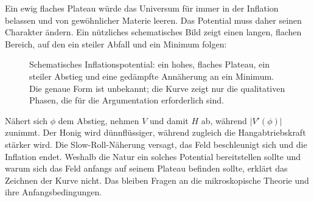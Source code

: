 Ein ewig flaches Plateau würde das Universum für immer in der Inflation belassen und von gewöhnlicher Materie leeren. Das Potential muss daher seinen Charakter ändern. Ein nützliches schematisches Bild zeigt einen langen, flachen Bereich, auf den ein steiler Abfall und ein Minimum folgen:
\begin{figure}[htbp]
\centering
\begin{coursefitfigure}
\end{coursefitfigure}
\caption{Schematisches Inflationspotential: ein hohes, flaches Plateau, ein steiler Abstieg und eine gedämpfte Annäherung an ein Minimum. Die genaue Form ist unbekannt; die Kurve zeigt nur die qualitativen Phasen, die für die Argumentation erforderlich sind.}
\label{fig:c09-inflation-potential}
\end{figure}

Nähert sich \(\phi\) dem Abstieg, nehmen \(V\) und damit \(H\) ab, während \(\lvert V'(\phi)\rvert\) zunimmt. Der Honig wird dünnflüssiger, während zugleich die Hangabtriebskraft stärker wird. Die Slow-Roll-Näherung versagt, das Feld beschleunigt sich und die Inflation endet. Weshalb die Natur ein solches Potential bereitstellen sollte und warum sich das Feld anfangs auf seinem Plateau befinden sollte, erklärt das Zeichnen der Kurve nicht. Das bleiben Fragen an die mikroskopische Theorie und ihre Anfangsbedingungen.

\begin{classroomqa}
\end{classroomqa}


